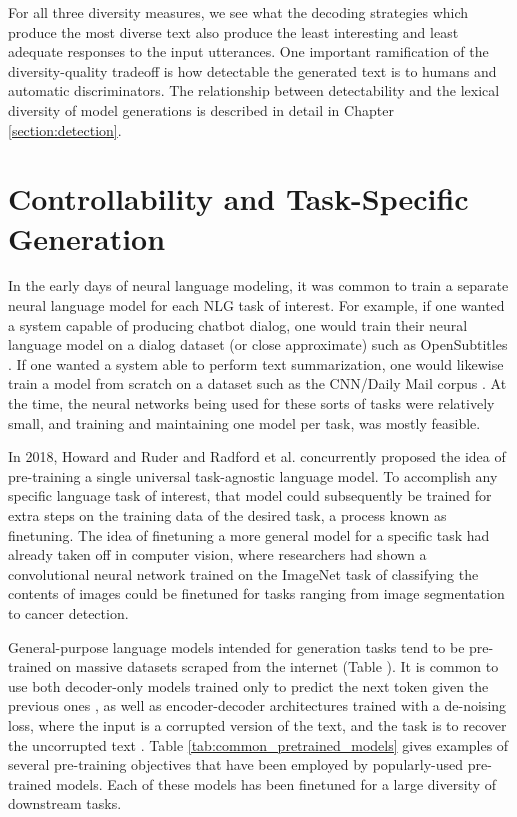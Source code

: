 \begin{itemize}
For all three diversity measures, we see what the decoding strategies which produce the most diverse text also produce the least interesting and least adequate responses to the input utterances.
One important ramification of the diversity-quality tradeoff is how detectable the generated text is to humans and automatic discriminators.
The relationship between detectability and the lexical diversity of model generations is described in detail in Chapter \ref{section:detection}.

\section{Controllability and Task-Specific Generation}

In the early days of neural language modeling, it was common to train a separate neural language model for each NLG task of interest.
For example, if one wanted a system capable of producing chatbot dialog, one would train their neural language model on a dialog dataset (or close approximate) such as OpenSubtitles \citep{vinyals2015neural}.
If one wanted a system able to perform text summarization, one would likewise train a model from scratch on a dataset such as the CNN/Daily Mail corpus \cite{nallapati2016abstractive,DBLP:journals/corr/SeeLM17}.
At the time, the neural networks being used for these sorts of tasks were relatively small, and training and maintaining one model per task, was mostly feasible.

In 2018, Howard and Ruder \citep{howard2018universal} and Radford et al. \citep{radford2018improving} concurrently proposed the idea of pre-training a single universal task-agnostic language model.
To accomplish any specific language task of interest, that model could subsequently be trained for extra steps on the training data of the desired task, a process known as finetuning.
The idea of finetuning a more general model for a specific task had already taken off in computer vision, where researchers had shown a convolutional neural network trained on the ImageNet task of classifying the contents of images could be finetuned for tasks ranging from image segmentation to cancer detection.

General-purpose language models intended for generation tasks tend to be pre-trained on massive datasets scraped from the internet (Table \label{tab:dataset_list}).
It is common to use both decoder-only models trained only to predict the next token given the previous ones \citep{radford2019language}, as well as encoder-decoder architectures trained with a de-noising loss, where the input is a corrupted version of the text, and the task is to recover the uncorrupted text \citep{raffel2019exploring,lewis2020bart}.
Table \ref{tab:common_pretrained_models} gives examples of several pre-training objectives that have been employed by popularly-used pre-trained models.
Each of these models has been finetuned for a large diversity of downstream tasks.


\end{itemize}

